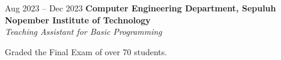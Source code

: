     \vspace{0.2 cm}

    \begin{twocolentry}{
        Aug 2023 – Dec 2023
    }
    \textbf{Computer Engineering Department, Sepuluh Nopember Institute of Technology}\\
    \textit{Teaching Assistant for Basic Programming}
    \end{twocolentry}

    \vspace{0.10 cm}

    \begin{onecolentry}
        \begin{highlights}
            \item Graded the Final Exam of over 70 students.
        \end{highlights}
    \end{onecolentry}
